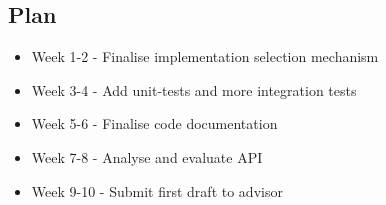 \documentclass[11pt]{article}
\begin{document}
\subsection{Plan}\label{plan}

\begin{itemize}
	\item Week 1-2 - Finalise implementation selection mechanism
	\item Week 3-4 - Add unit-tests and more integration tests
	\item Week 5-6 - Finalise code documentation
	\item Week 7-8 - Analyse and evaluate API
	\item Week 9-10 - Submit first draft to advisor
\end{itemize}
\end{document}
